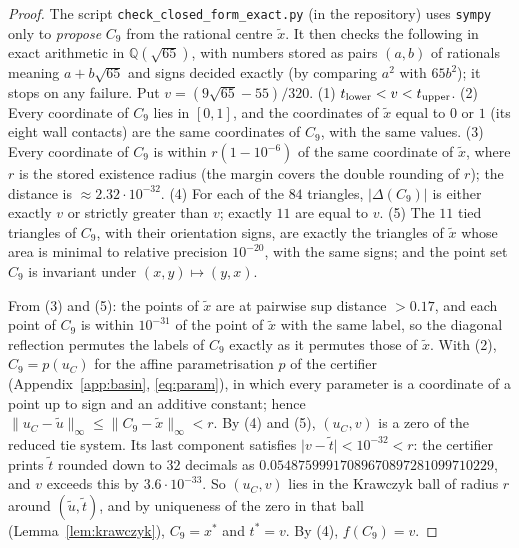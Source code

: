 \documentclass[11pt]{amsart}
\theoremstyle{definition}
\newcommand{\Q}{\mathbb{Q}}
\newcommand{\tstar}{t^{*}}
\begin{document}
\begin{proof}
The script \texttt{check\_closed\_form\_exact.py} (in the repository) uses \texttt{sympy} only to \emph{propose} $C_9$ from the rational centre $\tilde x$. It then checks the following in exact arithmetic in $\Q(\sqrt{65})$, with numbers stored as pairs $(a,b)$ of rationals meaning $a + b\sqrt{65}$ and signs decided exactly (by comparing $a^2$ with $65b^2$); it stops on any failure. Put $v = (9\sqrt{65}-55)/320$.
(1) $t_{\rm lower} < v < t_{\rm upper}$.
(2) Every coordinate of $C_9$ lies in $[0,1]$, and the coordinates of $\tilde x$ equal to $0$ or $1$ (its eight wall contacts) are the same coordinates of $C_9$, with the same values.
(3) Every coordinate of $C_9$ is within $r(1-10^{-6})$ of the same coordinate of $\tilde x$, where $r$ is the stored existence radius (the margin covers the double rounding of $r$); the distance is $\approx 2.32\cdot10^{-32}$.
(4) For each of the $84$ triangles, $\lvert\Delta(C_9)\rvert$ is either exactly $v$ or strictly greater than $v$; exactly $11$ are equal to $v$.
(5) The $11$ tied triangles of $C_9$, with their orientation signs, are exactly the triangles of $\tilde x$ whose area is minimal to relative precision $10^{-20}$, with the same signs; and the point set $C_9$ is invariant under $(x,y)\mapsto(y,x)$.

From (3) and (5): the points of $\tilde x$ are at pairwise sup distance $> 0.17$, and each point of $C_9$ is within $10^{-31}$ of the point of $\tilde x$ with the same label, so the diagonal reflection permutes the labels of $C_9$ exactly as it permutes those of $\tilde x$. With (2), $C_9 = p(u_C)$ for the affine parametrisation $p$ of the certifier (Appendix~\ref{app:basin}, \eqref{eq:param}), in which every parameter is a coordinate of a point up to sign and an additive constant; hence $\|u_C - \tilde u\|_\infty \le \|C_9 - \tilde x\|_\infty < r$. By (4) and (5), $(u_C, v)$ is a zero of the reduced tie system. Its last component satisfies $\lvert v - \tilde t\rvert < 10^{-32} < r$: the certifier prints $\tilde t$ rounded down to $32$ decimals as $0.05487599917089670897281099710229$, and $v$ exceeds this by $3.6\cdot10^{-33}$. So $(u_C, v)$ lies in the Krawczyk ball of radius $r$ around $(\tilde u,\tilde t)$, and by uniqueness of the zero in that ball (Lemma~\ref{lem:krawczyk}), $C_9 = x^*$ and $\tstar = v$. By (4), $f(C_9) = v$.
\end{proof}
\end{document}
